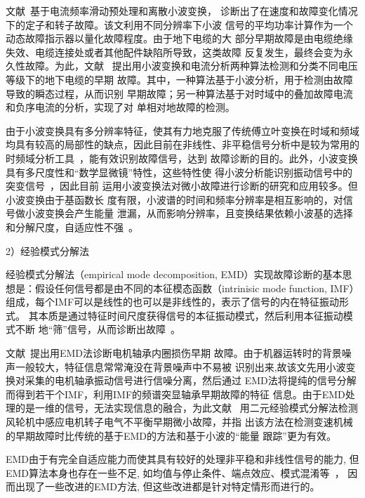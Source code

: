 文献~基于电流频率滑动预处理和离散小波变换，
诊断出了在速度和故障变化情况下的定子和转子故障。该文利用不同分辨率下小波
信号的平均功率计算作为一个动态故障指示器以量化故障程度。由于地下电缆的大
部分早期故障是由电缆绝缘失效、电缆连接处或者其他配件缺陷所导致，这类故障
反复发生，最终会变为永久性故障。为此，文献~
提出用小波变换和电流分析两种算法检测和分类不同电压等级下的地下电缆的早期
故障。其中，一种算法基于小波分析，用于检测由故障导致的瞬态过程，从而识别
早期故障；另一种算法基于对时域中的叠加故障电流和负序电流的分析，实现了对
单相对地故障的检测。

由于小波变换具有多分辨率特征，使其有力地克服了传统傅立叶变换在时域和频域
均具有较高的局部性的缺点，因此目前在非线性、非平稳信号分析中是较为常用的
时频域分析工具~\cite{junsheng2007application}，能有效识别故障信号，达到
故障诊断的目的。此外，小波变换具有多尺度性和“数学显微镜”特性，这些特性使
得小波分析能识别振动信号中的突变信号~\cite{wang1996application}，因此目前
运用小波变换法对微小故障进行诊断的研究和应用较多。但小波变换由于基函数长
度有限，小波谱的时间和频率分辨率是相互影响的，对信号做小波变换会产生能量
泄漏，从而影响分辨率，且变换结果依赖小波基的选择和分解尺度，自适应性不强~\cite{doudongyang2010ensemble}。

2）经验模式分解法

经验模式分解法（empirical mode decomposition, EMD）实现故障诊断的基本思
想是：假设任何信号都是由不同的本征模态函数（intrinisic mode function, IMF）
组成，每个IMF可以是线性的也可以是非线性的，表示了信号的内在特征振动形式。
其本质是通过特征时间尺度获得信号的本征振动模式，然后利用本征振动模式不断
地“筛”信号，从而诊断出故障~\cite{lei2013review}。

文献~提出用EMD法诊断电机轴承内圈损伤早期
故障。由于机器运转时的背景噪声一般较大，特征信息常常淹没在背景噪声中不易被
识别出来,故该文先用小波变换对采集的电机轴承振动信号进行信噪分离，然后通过
EMD法将提纯的信号分解而得到若干个IMF，利用IMF的频谱突显轴承早期故障的特征
信息。由于EMD处理的是一维的信号，无法实现信息的融合，为此文献~\cite{yang2011bivariate}
用二元经验模式分解法检测风轮机中感应电机转子电气不平衡早期微小故障，并指
出该方法在检测变速机械的早期故障时比传统的基于EMD的方法和基于小波的“能量
跟踪”更为有效。

EMD由于有完全自适应能力而使其具有较好的处理非平稳和非线性信号的能力, 但
EMD算法本身也存在一些不足, 如均值与停止条件、端点效应、模式混淆等~\cite{doudongyang2010ensemble}，
因而出现了一些改进的EMD方法, 但这些改进都是针对特定情形而进行的。

